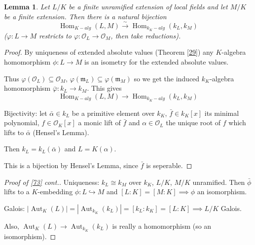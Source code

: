\documentclass[a4paper]{article}
\newtheorem{lemma}[definition]{Lemma}
\newcommand*\abs[1]{\left|#1\right|}
\DeclareMathOperator{\Aut}{Aut}
\DeclareMathOperator{\Hom}{Hom}
\begin{document}
\begin{lemma}
	Let $L/K$ be a finite unramified extension of local fields and let $M/K$ be a finite extension.
	Then there is a natural bijection
	$$\Hom_{K-alg}(L,M) \overset{\sim}{\to} \Hom_{k_K-alg}(k_L, k_M)$$
	($\varphi:L\to M$ restricts to $\varphi: \mathcal{O}_L \to \mathcal{O}_M$, then take reductions).
	\label{74}
\end{lemma}
\begin{proof}
	By uniqueness of extended absolute values (Theorem \ref{29})
	any $K$-algebra homomorphism $\phi: L \to M$ is an isometry for the extended absolute values.
	
	Thus $\varphi(\mathcal{O}_L) \subseteq \mathcal{O}_M$, $\varphi(\mathfrak{m}_L) \subseteq \varphi(\mathfrak{m}_M)$
	so we get the induced $k_K$-algebra homomorphism $\bar{\varphi}: k_L \to k_M$.
	This gives
	$$\Hom_{K-alg}(L,M) \to \Hom_{k_K-alg}(k_L, k_M)$$
	
	Bijectivity: let $\bar{\alpha} \in k_L$ be a primitive element over $k_K$,
	$\bar{f} \in k_K[x]$ its minimal polynomial,
	$f \in \mathcal{O}_K[x]$ a monic lift of $\bar{f}$ and $\alpha \in \mathcal{O}_L$ the unique root of $f$ which lifts to $\bar{\alpha}$ (Hensel's Lemma).
	
	Then $k_L = k_L(\bar{\alpha})$ and $L=K(\alpha)$.
	
	\begin{center}
	\end{center}
	This is a bijection by Hensel's Lemma,
	since $\bar{f}$ is seperable.
\end{proof}

\begin{proof}[Proof of \ref{73} cont.]
	Uniqueness: $k_L \cong k_M$ over $k_K$, $L/K$, $M/K$ unramified.
	Then $\bar{\phi}$ lifts to a $K$-embedding $\phi: L \hookrightarrow M$ and $[L:K]=[M:K] \implies \phi$ an isomorphism.
	
	Galois: $\abs{\Aut_K(L)} = \abs{\Aut_{k_K}(k_L)} = [k_L: k_K] = [L:K] \implies L/K$ Galois.
	
	Also, $\Aut_K(L) \to \Aut_{k_K}(k_L)$ is really a homomorphism (so an isomorphism).
\end{proof}
\end{document}
